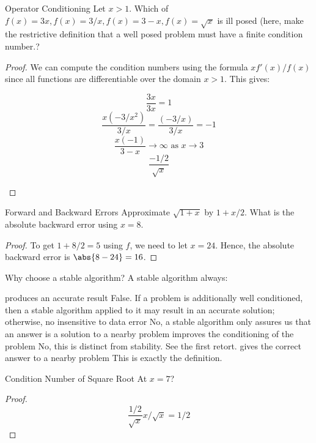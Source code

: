\documentclass[../main.tex]{subfiles}
\begin{document}
\begin{problem}{Operator Conditioning}
    Let $x > 1$. Which of $f(x) = 3x, f(x) = 3/x, f(x) = 3-x, f(x) = \sqrt{x}$ is ill posed (here, make the restrictive definition that a well posed problem must have a finite condition number.? 
\end{problem}
\begin{proof}
   We can compute the condition numbers using the formula $xf'(x)/f(x)$ since all functions are differentiable over the domain $x > 1$. This gives:

   \begin{outline}
       \1 \[
           \frac{3x}{3x} = 1
       \]
       \1 
       \[
           \frac{x (-3/x^2)}{3/x} = \frac{(-3/x)}{3/x} = -1
       \]
       \1 \[
           \frac{x (-1)}{3 - x} \to \infty \text{ as } x \to 3
       \]
       \1
       \[
           \frac{-1/2}{\sqrt{x}}
       \]
   \end{outline}
\end{proof}

\begin{problem}{Forward and Backward Errors}
    Approximate $\sqrt{1 + x}$ by $1 + x/2$. What is the absolute
    backward error using $x = 8$.
\end{problem}

\begin{proof}
    To get $1 + 8/2 = 5$ using $f$, we need to let $x = 24$. Hence,
    the absolute backward error is $\abs{8 - 24} = 16$.
\end{proof}

\begin{problem}{Why choose a stable algorithm?}
    A stable algorithm always:
    \begin{outline}
        \1 produces an accurate result
        \2 False. If a problem is additionally well conditioned, then
        a stable algorithm applied to it may result in an accurate solution; otherwise, no
        \1 insensitive to data error
        \2 No, a stable algorithm only assures us that an answer is a solution to a nearby problem
        \1 improves the conditioning of the problem
        \2 No, this is distinct from stability. See the first retort.
        \1 gives the correct answer to a nearby problem
        \2 This is exactly the definition.
    \end{outline}
\end{problem}

\begin{problem}{Condition Number of Square Root}
    At $x = 7$?
\end{problem}
\begin{proof}
    \[
        \frac{1/2}{\sqrt{x}}x \bigg/ \sqrt{x} = 1/2
    \]
\end{proof}
\end{document}
